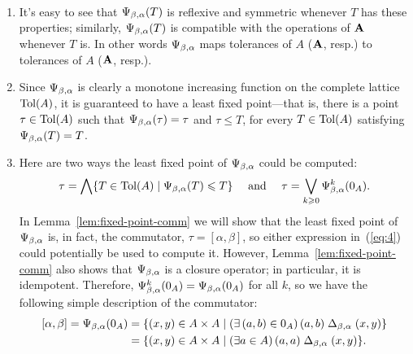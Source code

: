 \pagebreak[2]
\begin{remarks}\
  \begin{enumerate}
\item
  It's easy to see that $\Psi_{\beta, \alpha} (T)$ is reflexive and symmetric
  whenever $T$ has these properties; similarly, $\Psi_{\beta, \alpha} (T)$ is compatible with the
  operations of $\mathbf{A}$ whenever $T$ is. In other words $\Psi_{\beta, \alpha}$ maps tolerances of
  $A$ ($\mathbf{A}$, resp.) to tolerances of $A$ ($\mathbf{A}$, resp.).
  \item 
  Since $\Psi_{\beta, \alpha}$ is clearly a monotone increasing function on the complete
  lattice $\operatorname{Tol}(A)$, it is guaranteed to have a least fixed
  point---that is, there is a point $\tau\in \operatorname{Tol}(A)$ such that $\Psi_{\beta, \alpha}(\tau) = \tau$
  and $\tau \leq T$, for every $T \in \operatorname{Tol}(A)$
  satisfying $\Psi_{\beta, \alpha}(T) = T$.
\item
  Here are two ways the least fixed point of $\Psi_{\beta, \alpha}$ could be computed:
  \begin{equation}
    \label{eq:4}
  \tau = \bigwedge \{ T \in \operatorname{Tol}(A) \mid \Psi_{\beta, \alpha}(T) \leqslant T\}
  \quad \text{ and } \quad
     \tau = \bigvee_{k\geqslant 0} \Psi_{\beta, \alpha}^{k}(0_A).
  \end{equation}
  In Lemma~\ref{lem:fixed-point-comm} we will show that the least
  fixed point of $\Psi_{\beta, \alpha}$ is, in fact, the commutator,
  $\tau = [\alpha, \beta]$, so either
  expression in~(\ref{eq:4}) could potentially be used to compute it.
  However, Lemma~\ref{lem:fixed-point-comm} also shows that 
  $\Psi_{\beta, \alpha}$ is a closure operator; in particular, it is idempotent. Therefore,
  $\Psi_{\beta, \alpha}^{k}(0_A) = \Psi_{\beta, \alpha}(0_A)$ for all $k$, so we have 
  the following simple description of the commutator:
  \begin{align*}
          [\alpha, \beta] =
          \Psi_{\beta, \alpha}(0_A)
          &= \{ (x,y) \in A\times A \mid
          (\exists\, (a,b) \in 0_A)\, (a,b) \mathrel{\Delta_{\beta, \alpha}} (x,y)\}\\
          &= \{ (x,y) \in A\times A \mid
          (\exists a \in A)\, (a,a) \mathrel{\Delta_{\beta, \alpha}} (x,y)\}.
  \end{align*}


  \end{enumerate}
\end{remarks}


